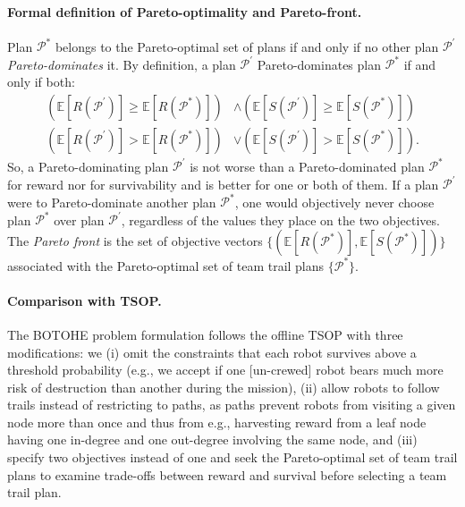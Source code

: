 \documentclass[fleqn,10pt,lineno]{wlpeerj}
\begin{document}
\paragraph{Formal definition of Pareto-optimality and Pareto-front.}
Plan $\mathcal{P}^*$ belongs to the Pareto-optimal set of plans if and only if no other plan $\mathcal{P}^\prime$ \emph{Pareto-dominates} it. By definition, a plan $\mathcal{P}^\prime$ Pareto-dominates plan $\mathcal{P}^*$ if and only if both:
\begin{align}
	\left (\mathbb{E}[R(\mathcal{P}^\prime)] \geq \mathbb{E}[R(\mathcal{P}^*)]  \right) & \wedge \left( \mathbb{E}[S(\mathcal{P}^\prime)] \geq \mathbb{E}[S(\mathcal{P}^*)] \right) \\
	\left( \mathbb{E}[R(\mathcal{P}^\prime)] > \mathbb{E}[R(\mathcal{P}^*)] \right) & \vee \left( \mathbb{E}[S(\mathcal{P}^\prime)] > \mathbb{E}[S(\mathcal{P}^*)] \right).
\end{align}
So, a Pareto-dominating plan $\mathcal{P}^\prime$ is not worse than a Pareto-dominated plan $\mathcal{P}^*$ for reward nor for survivability and is better for one or both of them.
If a plan $\mathcal{P}^\prime$ were to Pareto-dominate another plan $\mathcal{P}^*$, one would objectively never choose plan $\mathcal{P}^*$ over plan $\mathcal{P}^\prime$, regardless of the values they place on the two objectives. The \emph{Pareto front} is the set of objective vectors $\{(\mathbb{E}[R(\mathcal{P}^*)], \mathbb{E}[S(\mathcal{P}^*)])\}$ associated with the Pareto-optimal set of team trail plans $\{\mathcal{P}^*\}$.  

\paragraph{Comparison with TSOP.}
The BOTOHE problem formulation follows the offline TSOP \cite{jorgensen2018team} with three modifications: we 
(i) omit the constraints that each robot survives above a threshold probability (e.g., we accept if one [un-crewed] robot bears much more risk of destruction than another during the mission),
(ii) allow robots to follow trails instead of restricting to paths, as paths prevent robots from visiting a given node more than once and thus from e.g., harvesting reward from a leaf node having one in-degree and one out-degree involving the same node, 
and
(iii) specify two objectives instead of one and seek the Pareto-optimal set of team trail plans to examine trade-offs between reward and survival before selecting a team trail plan.
\end{document}
